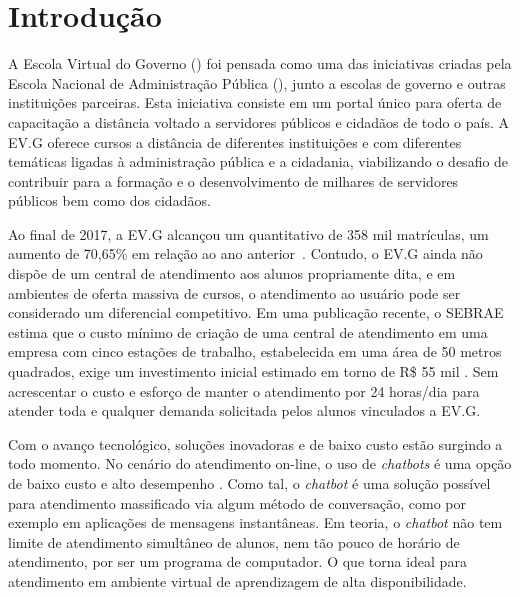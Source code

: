 \chapter{Introdução}\label{cap:01:introducao}

A Escola Virtual do Governo () foi pensada como uma das iniciativas criadas pela Escola Nacional de Administração Pública (), junto a escolas de governo e outras instituições parceiras.
Esta iniciativa consiste em um portal único para oferta de capacitação a distância voltado a servidores públicos e cidadãos de todo o país.
A EV.G oferece cursos a distância de diferentes instituições e com diferentes temáticas ligadas à administração pública e a cidadania, viabilizando o desafio de contribuir para a formação e o desenvolvimento de milhares de servidores públicos bem como dos cidadãos.

Ao final de 2017, a EV.G alcançou um quantitativo de 358 mil matrículas, um aumento de 70,65\% em relação ao ano anterior~\cite{EVGnumeros}.
Contudo, o EV.G ainda não dispõe de um central de atendimento aos alunos propriamente dita, e em ambientes de oferta massiva de cursos, o atendimento ao usuário pode ser considerado um diferencial competitivo.
Em uma publicação recente, o SEBRAE estima que o custo mínimo de criação de uma central de atendimento em uma empresa com cinco estações de trabalho, estabelecida em uma área de 50 metros quadrados, exige um investimento inicial estimado em torno de R\$ 55 mil \cite{SebraeCallCenter}.
Sem acrescentar o custo e esforço de manter o atendimento por 24 horas/dia para atender toda e qualquer demanda solicitada pelos alunos vinculados a EV.G.

Com o avanço tecnológico, soluções inovadoras e de baixo custo estão surgindo a todo momento.
No cenário do atendimento on-line, o uso de \textit{chatbots} é uma opção de baixo custo e alto desempenho \cite{CallCenterInf}.
Como tal, o \textit{chatbot} é uma solução possível para atendimento massificado via algum método de conversação, como por exemplo em aplicações de mensagens instantâneas.
Em teoria, o \textit{chatbot} não tem limite de atendimento simultâneo de alunos, nem tão pouco de horário de atendimento, por ser um programa de computador.
O que torna ideal para atendimento em ambiente virtual de aprendizagem de alta disponibilidade.

